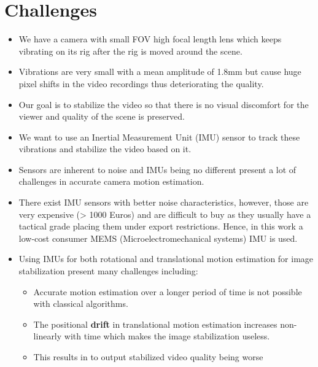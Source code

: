 \section{Challenges}

\begin{itemize}
\item We have a camera with small FOV high focal length lens which keeps vibrating on its rig after the rig is moved around the scene.

\item Vibrations are very small with a mean amplitude of 1.8mm but cause huge pixel shifts in the video recordings thus deteriorating the quality.

\item Our goal is to stabilize the video so that there is no visual discomfort for the viewer and quality of the scene is preserved.

\item We want to use an Inertial Measurement Unit (IMU) sensor to track these vibrations and stabilize the video based on it.

\item Sensors are inherent to noise and IMUs being no different present a lot of challenges in accurate camera motion estimation.

\item There exist IMU sensors with better noise characteristics, however, those are very expensive (> 1000 Euros) and are difficult to buy as they usually have a tactical grade placing them under export restrictions. Hence, in this work a low-cost consumer MEMS (Microelectromechanical systems) IMU is used.

\item Using IMUs for both rotational and translational motion estimation for image stabilization present many challenges including:
\begin{itemize}
    \item Accurate motion estimation over a longer period of time is not possible with classical algorithms.
    
    \item The positional \textbf{drift} in translational motion estimation increases non-linearly with time which makes the image stabilization useless.

    \item This results in to output stabilized video quality being worse
    
\end{itemize}


\end{itemize}
